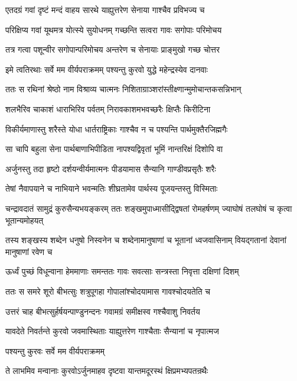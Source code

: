 \twolineshloka
{एतदग्रं गवां दृष्टं मन्दं वाहय सारथे}
{याह्युत्तरेण सेनाया गाश्चैव प्रविभज्य च}


\twolineshloka
{परिक्षिप्य गवां यूथमत्र योत्स्ये सुयोधनम्}
{गच्छन्ति सत्वरा गावः सगोपाः परिमोचय}


\twolineshloka
{तत्र गत्वा पशून्वीर सगोपान्परिमोचय}
{अन्तरेण च सेनायाः प्राङ्मुखो गच्छ चोत्तर}


\twolineshloka
{इमे त्वतिरथाः सर्वे मम वीर्यपराक्रमम्}
{पश्यन्तु कुरवो युद्धे महेन्द्रस्येव दानवाः}



\twolineshloka
{ततः स रथिनां श्रेष्ठो नाम विश्राव्य चात्मनः}
{निशिताग्राञ्शरांस्तीक्ष्णान्मुमोचान्तकसन्निभान्}


\twolineshloka
{शलभैरिव चाकाशं धाराभिरिव पर्वतम्}
{निरावकाशमभवच्छरैः क्षिप्तैः किरीटिना}


\twolineshloka
{विकीर्यमाणास्तु शरैस्ते योधा धार्तराष्ट्रिकाः}
{गाश्चैव न च पश्यन्ति पार्थमुक्तैरजिह्मगैः}


\twolineshloka
{सा चापि बहुला सेना पार्थबाणाभिपीडिता}
{नापश्यद्विवृतां भूमिं नान्तरिक्षं दिशोपि वा}


\twolineshloka
{अर्जुनस्तु तदा हृष्टो दर्शयन्वीर्यमात्मनः}
{पीडयामास सैन्यानि गाण्डीवप्रसृतैः शरैः}


\twolineshloka
{तेषां नैवापयाने च नाभियाने भवन्मतिः}
{शीघ्रतामेव पार्थस्य पूजयन्तस्तु विस्मिताः}


\threelineshloka
{चन्द्रावदातं सामुद्रं कुरुसैन्यभयङ्करम्}
{ततः शङ्खमुपाध्मासीद्द्विषतां रोमहर्षणम्}
{ज्याघोषं तलघोषं च कृत्वा भूतान्यमोहयत्}


\threelineshloka
{तस्य शङ्खस्य शब्देन धनुषो निस्वनेन च}
{शब्देनामानुषाणां च भूतानां ध्वजवासिनाम्}
{वियद्गतानां देवानां मानुषाणां रवेण च}


\twolineshloka
{ऊर्ध्वं पुच्छं विधून्वाना हेममाणाः समन्ततः}
{गावः सवत्साः सन्त्रस्ता निवृत्ता दक्षिणां दिशम्}


\twolineshloka
{ततः स समरे शूरो बीभत्सुः शत्रुपूगहा}
{गोपालांश्चोदयामास गावश्चोदयतेति च}


\twolineshloka
{उत्तरं चाह बीभत्सुर्हर्षयन्पाण्डुनन्दनः}
{गवामग्रं समीक्षस्व गश्चैवाशु निवर्तय}


\twolineshloka
{यावदेते निवर्तन्ते कुरवो जवमास्थिताः}
{याह्युत्तरेण गाश्चैताः सैन्यानां च नृपात्मज}


\onelineshloka
{पश्यन्तु कुरवः सर्वे मम वीर्यपराक्रमम्}



\twolineshloka
{ते लाभमिव मन्वानाः कुरवोऽर्जुनमाहव}
{दृष्टवा यान्तमदूरस्थं क्षिप्रमभ्यपतन्रथैः}


